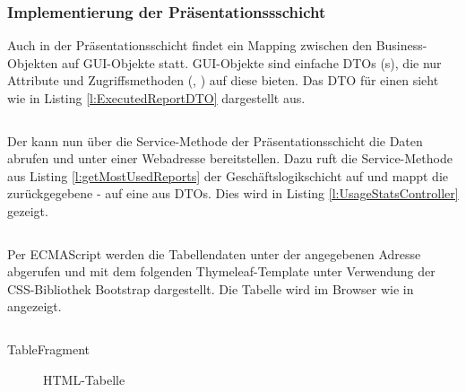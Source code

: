 \subsubsection{Implementierung der Präsentationssschicht}\label{sec:ImplementierungPraesentationsschicht}
Auch in der Präsentationsschicht findet ein Mapping zwischen den  Business-Objekten auf \ac{GUI}-Objekte statt. \ac{GUI}-Objekte sind einfache \acs{DTO}s (s), die nur Attribute und Zugriffsmethoden (, ) auf diese bieten. Das \ac{DTO} für einen  sieht wie in Listing \ref{l:ExecutedReportDTO} dargestellt aus.
\begin{listing}[ht]
  \inputminted{java}{Listings/ExecutedReportDTO.java}
  \caption{}
  \label{l:ExecutedReportDTO}
\end{listing}
Der  kann nun über die Service-Methode  der Präsentationsschicht die Daten abrufen und unter einer Webadresse bereitstellen. Dazu ruft  die Service-Methode aus Listing \ref{l:getMostUsedReports} der Geschäftslogikschicht auf und mappt die zurückgegebene - auf eine  aus \ac{DTO}s. Dies wird in Listing \ref{l:UsageStatsController} gezeigt.
\begin{listing}[ht]
  \inputminted{java}{Listings/UsageStatsController.java}
  \caption{}
  \label{l:UsageStatsController}
\end{listing}
Per ECMAScript werden die Tabellendaten unter der angegebenen Adresse abgerufen und \ua mit dem folgenden Thymeleaf-Template unter Verwendung der CSS-Bibliothek Bootstrap dargestellt. Die Tabelle wird im Browser wie in  angezeigt.
\begin{listing}[ht]
  \inputminted{java}{Listings/TableFragment.html}
  \caption{TableFragment}
  \label{l:TableFragment}
\end{listing}
\begin{figure}[htb]
	\centering
	\caption{HTML-Tabelle}
	\label{fig:Tabelle}
\end{figure}

\clearpage

